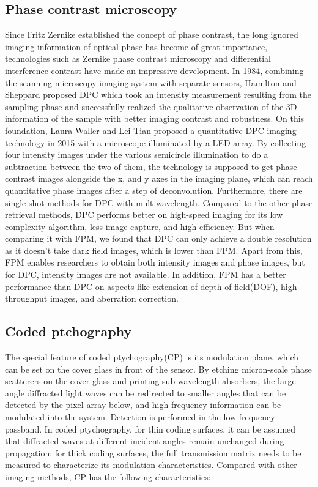\documentclass[journal,review,submit,pdftex,moreauthors]{Definitions/mdpi}
\begin{document}
\subsection{Phase contrast microscopy}
Since Fritz Zernike established the concept of phase contrast\cite{zernike1942phase}, the long ignored imaging information of optical phase has become of great importance, technologies such as Zernike phase contrast microscopy and differential interference contrast\cite{nomarski1955application} have made an impressive development. In 1984, combining the scanning microscopy imaging system with separate sensors, Hamilton and Sheppard proposed DPC\cite{hamilton1984differential} which took an intensity measurement resulting from the sampling phase and successfully realized the qualitative observation of the 3D information of the sample with better imaging contrast and robustness. On this foundation, Laura Waller and Lei Tian proposed a quantitative DPC imaging technology in 2015 with a microscope illuminated by a LED array\cite{tian2015quantitative}. By collecting four intensity images under the various semicircle illumination to do a subtraction between the two of them, the technology is supposed to get phase contrast images alongside the x, and y axes in the imaging plane, which can reach quantitative phase images after a step of deconvolution. Furthermore, there are single-shot methods for DPC with mult-wavelength\cite{liu2023single}.
Compared to the other phase retrieval methods, DPC performs better on high-speed imaging for its low complexity algorithm, less image capture, and high efficiency. But when comparing it with FPM, we found that DPC can only achieve a double resolution as it doesn’t take dark field images, which is lower than FPM. Apart from this, FPM enables researchers to obtain both intensity images and phase images, but for DPC, intensity images are not available. In addition, FPM has a better performance than DPC on aspects like extension of depth of field(DOF), high-throughput images, and aberration correction.  


\subsection{Coded ptchography}
The special feature of coded ptychography(CP) is its modulation plane, which can be set on the cover glass in front of the sensor. By etching micron-scale phase scatterers on the cover glass and printing sub-wavelength absorbers, the large-angle diffracted light waves can be redirected to smaller angles that can be detected by the pixel array below, and high-frequency information can be modulated into the system. Detection is performed in the low-frequency passband.
In coded ptychography, for thin coding surfaces, it can be assumed that diffracted waves at different incident angles remain unchanged during propagation; for thick coding surfaces, the full transmission matrix needs to be measured to characterize its modulation characteristics. Compared with other imaging methods, CP has the following characteristics\cite{wang2023optical}:
\end{document}
